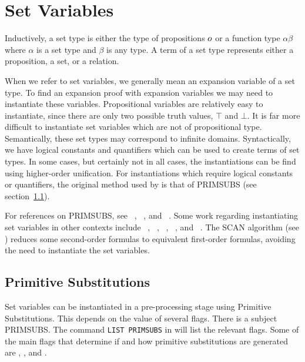 \chapter{Set Variables}

Inductively, a set type is either the type of propositions
$o$ or a function type $\alpha\beta$ where $\alpha$
is a set type and $\beta$ is any type.  A term of a set type
represents either a proposition, a set, or a relation.

When we refer to set variables, we generally mean
an expansion variable of a set type.  To find
an expansion proof with expansion variables we
may need to instantiate these variables.
Propositional variables are relatively easy to instantiate,
since there are only two possible truth values, $\top$ and $\bot$.
It is far more difficult to instantiate set variables which
are not of propositional type.  Semantically, these set types
may correspond to infinite domains.  Syntactically, we have
logical constants and quantifiers which can be used to create
terms of set types.
In some cases, but certainly not in all cases, the instantiations
can be find using higher-order unification.  For instantiations which require
logical constants or quantifiers, the original method used by
\TPS is that of PRIMSUBS (see section~\ref{setvars:primsubs}).

For references on PRIMSUBS, see ~\cite{Andrews89}, ~\cite{Andrews95b}, and ~\cite{Andrews99}.
Some work regarding instantiating set variables in other
contexts include   %
~\cite{Bledsoe77}, ~\cite{Bledsoe79}, ~\cite{Bledsoe83}, ~\cite{Bledsoe93}, 
and ~\cite{Bailin93}.
The SCAN algorithm (see ) %
reduces some second-order formulas
to equivalent first-order formulas, avoiding the need
to instantiate the set variables.

\section{Primitive Substitutions}\label{setvars:primsubs}

Set variables can be instantiated in a pre-processing stage
using Primitive Substitutions.  This depends on the value
of several flags.  There is a subject PRIMSUBS.
The command \verb+LIST PRIMSUBS+ in \TPS will list
the relevant flags.  Some of the main flags that determine
if and how primitive substitutions are generated are
, ,
and .

